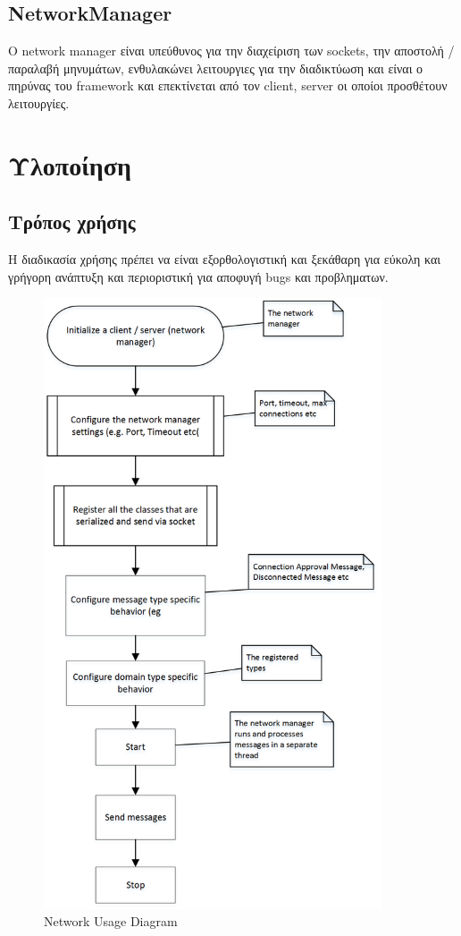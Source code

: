 		\subsection{NetworkManager}
		Ο network manager είναι υπεύθυνος για την διαχείριση των sockets, την αποστολή / παραλαβή μηνυμάτων, ενθυλακώνει λειτουργιες για την διαδικτύωση και είναι ο πηρύνας του framework και επεκτίνεται από τον client, server οι οποίοι προσθέτουν λειτουργίες.
			
		\section{Υλοποίηση}	
		\subsection{Τρόπος χρήσης}
		Η διαδικασία χρήσης πρέπει να είναι εξορθολογιστική και ξεκάθαρη για εύκολη και γρήγορη ανάπτυξη και περιοριστική για αποφυγή bugs και προβληματων.
		\begin{figure}
			\centering
			\includegraphics[width=100mm]{Images/network_usage_diagram}
			\caption{Network Usage Diagram}
			\label{fig:Network Usage_Diagram}
		\end{figure}	
					
